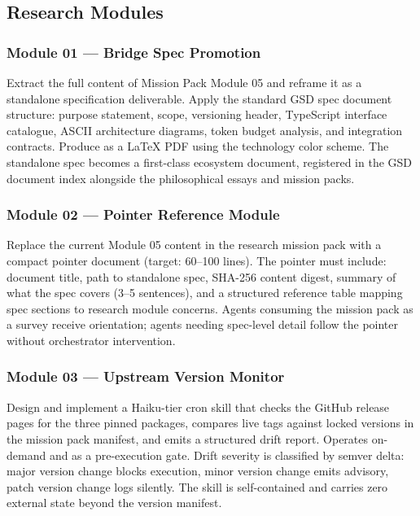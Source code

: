 \documentclass[11pt,letterpaper]{article}
\begin{document}
\subsection{Research Modules}

\subsubsection{Module 01 --- Bridge Spec Promotion}

Extract the full content of Mission Pack Module 05 and reframe it as a standalone specification deliverable. Apply the standard GSD spec document structure: purpose statement, scope, versioning header, TypeScript interface catalogue, ASCII architecture diagrams, token budget analysis, and integration contracts. Produce as a LaTeX PDF using the technology color scheme. The standalone spec becomes a first-class ecosystem document, registered in the GSD document index alongside the philosophical essays and mission packs.

\subsubsection{Module 02 --- Pointer Reference Module}

Replace the current Module 05 content in the research mission pack with a compact pointer document (target: 60--100 lines). The pointer must include: document title, path to standalone spec, SHA-256 content digest, summary of what the spec covers (3--5 sentences), and a structured reference table mapping spec sections to research module concerns. Agents consuming the mission pack as a survey receive orientation; agents needing spec-level detail follow the pointer without orchestrator intervention.

\subsubsection{Module 03 --- Upstream Version Monitor}

Design and implement a Haiku-tier cron skill that checks the GitHub release pages for the three pinned packages, compares live tags against locked versions in the mission pack manifest, and emits a structured drift report. Operates on-demand and as a pre-execution gate. Drift severity is classified by semver delta: major version change blocks execution, minor version change emits advisory, patch version change logs silently. The skill is self-contained and carries zero external state beyond the version manifest.
\end{document}
